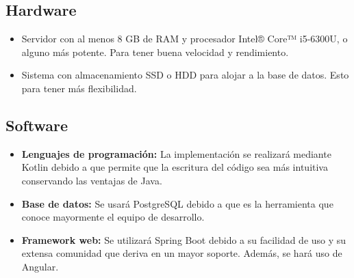 \subsection{Hardware}
\begin{itemize}
    \item Servidor con al menos 8 GB de RAM y procesador Intel® Core™ i5-6300U, o alguno más potente. Para tener buena velocidad y rendimiento.
    \item Sistema con almacenamiento SSD o HDD para alojar a la base de datos. Esto para tener más flexibilidad.
\end{itemize}

\subsection{Software}
\begin{itemize}
    \item \textbf{Lenguajes de programación:} La implementación se realizará mediante Kotlin debido a que permite que la escritura del código sea más intuitiva conservando las ventajas de Java.
    \item \textbf{Base de datos:} Se usará PostgreSQL debido a que es la herramienta que conoce mayormente el equipo de desarrollo.
    \item \textbf{Framework web:} Se utilizará Spring Boot debido a su facilidad de uso y su extensa comunidad que deriva en un mayor soporte. Además, se hará uso de Angular.
\end{itemize}

